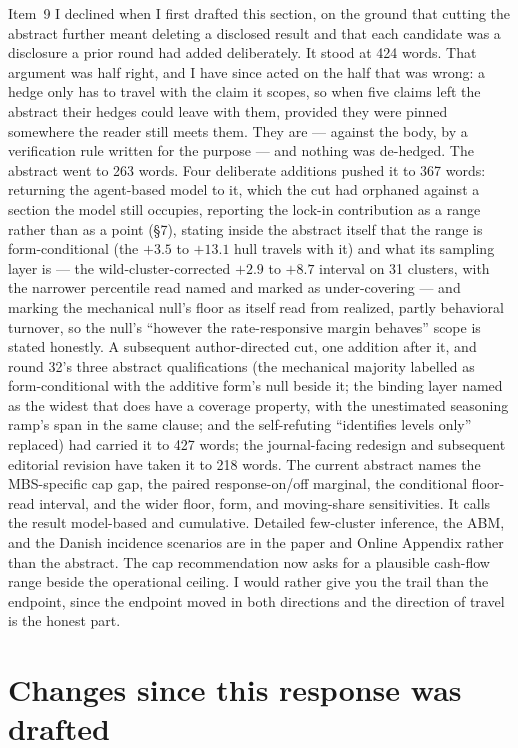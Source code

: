 \documentclass[11pt]{article}
\begin{document}
Item~9 I declined when I first drafted this section, on the ground that cutting the
abstract further meant deleting a disclosed result and that each candidate was a
disclosure a prior round had added deliberately. It stood at 424 words. That
argument was half right, and I have since acted on the half that was wrong: a hedge
only has to travel with the claim it scopes, so when five claims left the abstract
their hedges could leave with them, provided they were pinned somewhere the reader
still meets them. They are --- against the body, by a verification rule written for
the purpose --- and nothing was de-hedged. The abstract went to 263 words. Four
deliberate additions pushed it to 367 words: returning the agent-based model to
it, which the cut had orphaned against a section the model still occupies,
reporting the lock-in contribution as a range rather than as a point (\S7),
stating inside the abstract itself that the range is form-conditional (the
$+3.5$ to $+13.1$ hull travels with it) and what its sampling layer is --- the
wild-cluster-corrected $+2.9$ to $+8.7$ interval on 31 clusters, with the
narrower percentile read named and marked as under-covering --- and marking the
mechanical null's floor as itself read from realized, partly behavioral
turnover, so the null's ``however the rate-responsive margin behaves'' scope is stated honestly. A
subsequent author-directed cut, one addition after it, and round 32's three abstract qualifications
(the mechanical majority labelled as form-conditional with the additive form's null beside
it; the binding layer named as the widest that does have a coverage property, with the
unestimated seasoning ramp's span in the same clause; and the self-refuting ``identifies
levels only'' replaced) had carried it to 427 words; the journal-facing redesign and subsequent editorial revision have taken it to 218 words. The current abstract names the MBS-specific cap gap, the paired response-on/off marginal, the conditional floor-read interval, and the wider floor, form, and moving-share sensitivities. It calls the result model-based and cumulative. Detailed few-cluster inference, the ABM, and the Danish incidence scenarios are in the paper and Online Appendix rather than the abstract. The cap recommendation now asks for a plausible cash-flow range beside the operational ceiling. I would
rather give you the trail than the endpoint, since the endpoint moved in both directions
and the direction of travel is the honest part.

\section{Changes since this response was drafted}
\end{document}

